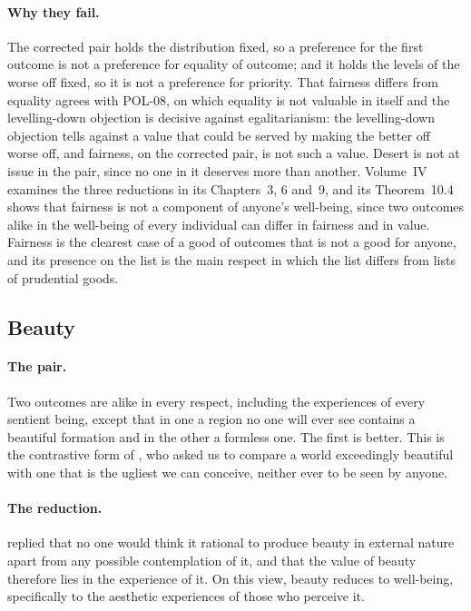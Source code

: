 \documentclass{situationist-preprint}
\begin{document}
\paragraph{Why they fail.} The corrected pair holds the distribution fixed, so a preference for the first outcome is not a preference for equality of outcome; and it holds the levels of the worse off fixed, so it is not a preference for priority. That fairness differs from equality agrees with POL-08, on which equality is not valuable in itself and the levelling-down objection \citep{Parfit1997} is decisive against egalitarianism: the levelling-down objection tells against a value that could be served by making the better off worse off, and fairness, on the corrected pair, is not such a value. Desert is not at issue in the pair, since no one in it deserves more than another. Volume~IV examines the three reductions in its Chapters~3, 6 and~9, and its Theorem~10.4 shows that fairness is not a component of anyone's well-being, since two outcomes alike in the well-being of every individual can differ in fairness and in value. Fairness is the clearest case of a good of outcomes that is not a good for anyone, and its presence on the list is the main respect in which the list differs from lists of prudential goods.

\subsection{Beauty}

\paragraph{The pair.} Two outcomes are alike in every respect, including the experiences of every sentient being, except that in one a region no one will ever see contains a beautiful formation and in the other a formless one. The first is better. This is the contrastive form of \citet[\S50]{Moore1903}, who asked us to compare a world exceedingly beautiful with one that is the ugliest we can conceive, neither ever to be seen by anyone.

\paragraph{The reduction.} \citet[III.xiv]{Sidgwick1907} replied that no one would think it rational to produce beauty in external nature apart from any possible contemplation of it, and that the value of beauty therefore lies in the experience of it. On this view, beauty reduces to well-being, specifically to the aesthetic experiences of those who perceive it.
\end{document}

